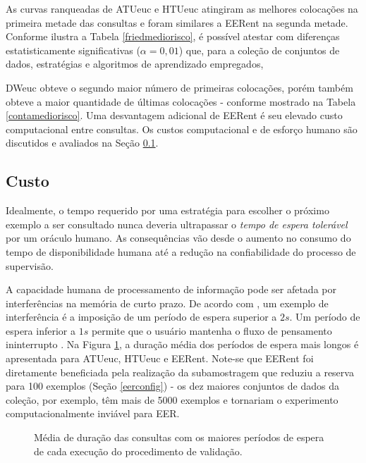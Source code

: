 As curvas ranqueadas de ATUeuc e HTUeuc atingiram as melhores colocações na primeira metade das consultas e foram similares a EERent na segunda metade.
Conforme ilustra a Tabela \ref{friedmediorisco}, é possível atestar com diferenças estatisticamente significativas ($\alpha=0,01$) que, para a coleção de conjuntos de dados, estratégias e algoritmos de aprendizado empregados,



DWeuc obteve o segundo maior número de primeiras colocações, porém também obteve a maior quantidade de últimas colocações - conforme mostrado na Tabela \ref{contamediorisco}.
Uma desvantagem adicional de EERent é seu elevado
custo computacional entre consultas.
Os custos computacional e de esforço humano são discutidos e avaliados na Seção \ref{cuscomp}.

\subsection{Custo}\label{cuscomp}

Idealmente, o tempo requerido por uma estratégia para escolher o próximo exemplo a ser consultado nunca deveria ultrapassar o \textit{tempo de espera tolerável} \cite{conf/amcis/Nah03} por um oráculo humano.
As consequências vão desde o aumento no consumo do tempo de disponibilidade humana até a redução na confiabilidade do processo de supervisão.

A capacidade humana de processamento de informação pode ser afetada por interferências na memória de curto prazo.
De acordo com , um exemplo de interferência é a imposição de um período de espera superior a $2s$.
Um período de espera inferior a $1s$ permite que o usuário mantenha o fluxo de pensamento ininterrupto \cite{conf/amcis/Nah03}.
Na Figura \ref{tempos}, a duração média dos períodos de espera mais longos é apresentada para ATUeuc, HTUeuc e EERent.
Note-se que EERent foi diretamente beneficiada pela realização da subamostragem que reduziu a reserva para 100 exemplos (Seção \ref{eerconfig}) - os dez maiores conjuntos de dados da coleção, por exemplo, têm mais de 5000 exemplos e tornariam o experimento computacionalmente inviável para EER.
\begin{figure}
	\centering
	
	\caption[Média de duração das consultas.]{Média de duração das consultas com os maiores períodos de espera de cada execução do procedimento de validação.}
	\label{tempos}
\end{figure}

